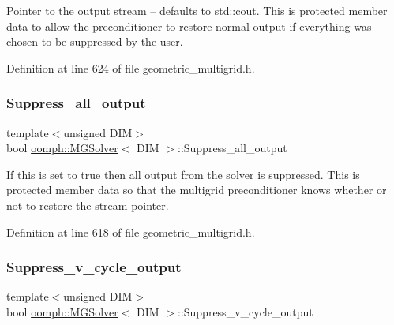 Pointer to the output stream -- defaults to std\+::cout. This is protected member data to allow the preconditioner to restore normal output if everything was chosen to be suppressed by the user. 



Definition at line 624 of file geometric\+\_\+multigrid.\+h.

\mbox{\label{classoomph_1_1MGSolver_a0cd765279d8e8f3929cc253fd00ba9eb}} 
\subsubsection{\texorpdfstring{Suppress\+\_\+all\+\_\+output}{Suppress\_all\_output}}
{\footnotesize\ttfamily template$<$unsigned D\+IM$>$ \\
bool \hyperlink{classoomph_1_1MGSolver}{oomph\+::\+M\+G\+Solver}$<$ D\+IM $>$\+::Suppress\+\_\+all\+\_\+output\hspace{0.3cm}{\ttfamily [protected]}}



If this is set to true then all output from the solver is suppressed. This is protected member data so that the multigrid preconditioner knows whether or not to restore the stream pointer. 



Definition at line 618 of file geometric\+\_\+multigrid.\+h.

\mbox{\label{classoomph_1_1MGSolver_ac533f8f9a9f6efaf5b3c63fbdd09e0d1}} 
\subsubsection{\texorpdfstring{Suppress\+\_\+v\+\_\+cycle\+\_\+output}{Suppress\_v\_cycle\_output}}
{\footnotesize\ttfamily template$<$unsigned D\+IM$>$ \\
bool \hyperlink{classoomph_1_1MGSolver}{oomph\+::\+M\+G\+Solver}$<$ D\+IM $>$\+::Suppress\+\_\+v\+\_\+cycle\+\_\+output\hspace{0.3cm}{\ttfamily [protected]}}



